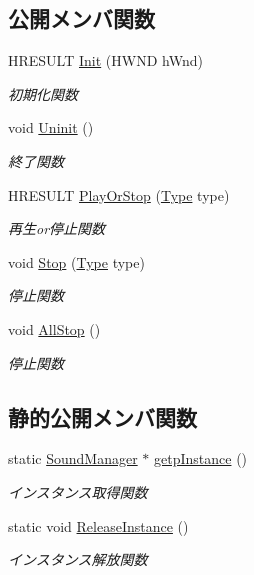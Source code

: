 \subsection*{公開メンバ関数}
\begin{DoxyCompactItemize}
\item 
H\+R\+E\+S\+U\+LT \mbox{\hyperlink{class_sound_manager_ab6f67ebd0f3a3555b334870c46c6d52b}{Init}} (H\+W\+ND h\+Wnd)
\begin{DoxyCompactList}\small\item\em 初期化関数 \end{DoxyCompactList}\item 
void \mbox{\hyperlink{class_sound_manager_a61543e2532817e5116fa4f7808545921}{Uninit}} ()
\begin{DoxyCompactList}\small\item\em 終了関数 \end{DoxyCompactList}\item 
H\+R\+E\+S\+U\+LT \mbox{\hyperlink{class_sound_manager_a190f088a8f9c95b596ec61ccc323f86c}{Play\+Or\+Stop}} (\mbox{\hyperlink{class_sound_manager_a0b81fc2281f062cd6489ab281fc3be1d}{Type}} type)
\begin{DoxyCompactList}\small\item\em 再生or停止関数 \end{DoxyCompactList}\item 
void \mbox{\hyperlink{class_sound_manager_a97ace4d5c214d5a97f749e2c76e2c18d}{Stop}} (\mbox{\hyperlink{class_sound_manager_a0b81fc2281f062cd6489ab281fc3be1d}{Type}} type)
\begin{DoxyCompactList}\small\item\em 停止関数 \end{DoxyCompactList}\item 
void \mbox{\hyperlink{class_sound_manager_a59093ea4593b0f9036f976db929aecb1}{All\+Stop}} ()
\begin{DoxyCompactList}\small\item\em 停止関数 \end{DoxyCompactList}\end{DoxyCompactItemize}
\subsection*{静的公開メンバ関数}
\begin{DoxyCompactItemize}
\item 
static \mbox{\hyperlink{class_sound_manager}{Sound\+Manager}} $\ast$ \mbox{\hyperlink{class_sound_manager_ae46d05e32c52587ff3988f5ef81c1cbe}{getp\+Instance}} ()
\begin{DoxyCompactList}\small\item\em インスタンス取得関数 \end{DoxyCompactList}\item 
static void \mbox{\hyperlink{class_sound_manager_a5761e23b2658ba177703c40088f5e43e}{Release\+Instance}} ()
\begin{DoxyCompactList}\small\item\em インスタンス解放関数 \end{DoxyCompactList}\end{DoxyCompactItemize}
